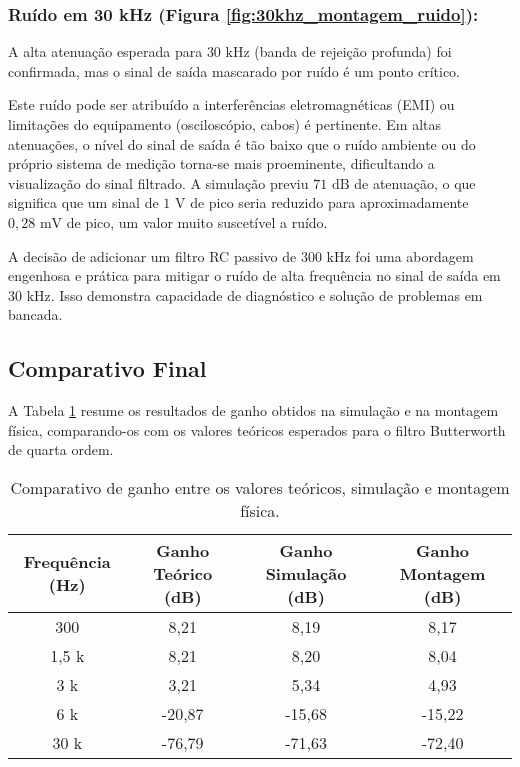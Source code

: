 \subsubsection{Ruído em 30 kHz (Figura \ref{fig:30khz_montagem_ruido}):}
A alta atenuação esperada para $30 \text{ kHz}$ (banda de rejeição profunda) foi confirmada, mas o sinal de saída mascarado por ruído é um ponto crítico.

Este ruído pode ser atribuído a interferências eletromagnéticas (EMI) ou limitações do equipamento (osciloscópio, cabos) é pertinente. Em altas atenuações, o nível do sinal de saída é tão baixo que o ruído ambiente ou do próprio sistema de medição torna-se mais proeminente, dificultando a visualização do sinal filtrado. A simulação previu $71 \text{ dB}$ de atenuação, o que significa que um sinal de $1 \text{ V}$ de pico seria reduzido para aproximadamente $0,28 \text{ mV}$ de pico, um valor muito suscetível a ruído.

A decisão de adicionar um filtro RC passivo de $300 \text{ kHz}$ foi uma abordagem engenhosa e prática para mitigar o ruído de alta frequência no sinal de saída em $30 \text{ kHz}$. Isso demonstra capacidade de diagnóstico e solução de problemas em bancada.

\subsection{Comparativo Final}

A Tabela \ref{tab:comparativo_resultados} resume os resultados de ganho obtidos na simulação e na montagem física, comparando-os com os valores teóricos esperados para o filtro Butterworth de quarta ordem.

\begin{table}[H]
\centering
\begin{tabular}{|c|c|c|c|}
\hline
\textbf{Frequência (Hz)} & \textbf{Ganho Teórico (dB)} & \textbf{Ganho Simulação (dB)} & \textbf{Ganho Montagem (dB)} \\
\hline
300 & 8,21 & 8,19 & 8,17 \\ \hline
1,5 k & 8,21 & 8,20 & 8,04 \\ \hline
3 k & 3,21 & 5,34 & 4,93 \\ \hline
6 k & -20,87 & -15,68 & -15,22 \\ \hline
30 k & -76,79 & -71,63 & -72,40 \\ \hline
\end{tabular}
\caption{Comparativo de ganho entre os valores teóricos, simulação e montagem física.}
\label{tab:comparativo_resultados}
\end{table}

